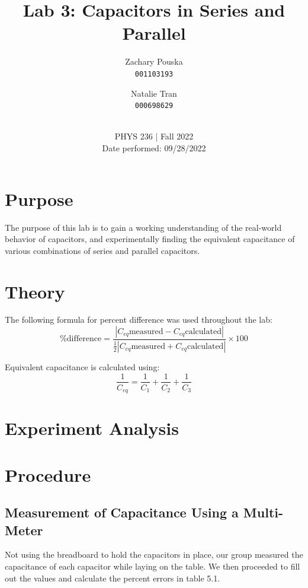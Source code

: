 \documentclass[titlepage]{article}
\begin{document}
\title{\textbf{Lab 3: Capacitors in Series and Parallel}}
\author{
    Zachary Pouska\\
    \texttt{001103193}\\
    \and
    Natalie Tran \\ 
    \texttt{000698629}\\ \\
} 

\date{PHYS 236 | Fall 2022\\
Date performed: 09/28/2022}


	\maketitle



	\section{Purpose}
    The purpose of this lab is to gain a working understanding of the real-world behavior of capacitors, and experimentally finding the equivalent capacitance of various combinations of series and parallel capacitors.

	\section{Theory}	

    The following formula for percent difference was used throughout the lab: $$\text{\% difference} = \frac{|C_{eq}\text{measured} - C_{eq}\text{calculated} |}{\frac{1}{2} |C_{eq}\text{measured} + C_{eq}\text{calculated}|} \times 100$$

    Equivalent capacitance is calculated using: 
    $$\frac{1}{C_{eq}} = \frac{1}{C_1}+\frac{1}{C_2} + \frac{1}{C_3}
    $$



	\section{Experiment Analysis}

    



	\section{Procedure}

        \subsection{Measurement of Capacitance Using a Multi-Meter}
        Not using the breadboard to hold the capacitors in place, our group measured the capacitance of each capacitor while laying on the table. We then proceeded to fill out the values and calculate the percent errors in table 5.1.
\end{document}
